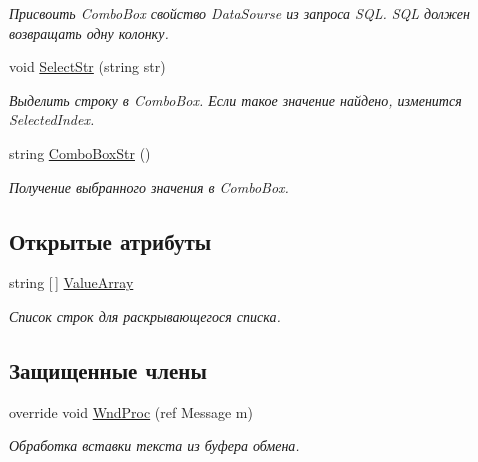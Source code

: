 \begin{DoxyCompactItemize}
\begin{DoxyCompactList}\small\item\em Присвоить Combo\+Box свойство Data\+Sourse из запроса S\+QL. S\+QL должен возвращать одну колонку. \end{DoxyCompactList}\item 
void \mbox{\hyperlink{class_f_b_a_1_1_combo_box_f_b_a_a5c209c5dbfdf27b8239b1aeb58aaf539}{Select\+Str}} (string str)
\begin{DoxyCompactList}\small\item\em Выделить строку в Combo\+Box. Если такое значение найдено, изменится Selected\+Index. \end{DoxyCompactList}\item 
string \mbox{\hyperlink{class_f_b_a_1_1_combo_box_f_b_a_a43f7d2e7d271590ca56c4234cf30da1b}{Combo\+Box\+Str}} ()
\begin{DoxyCompactList}\small\item\em Получение выбранного значения в Combo\+Box. \end{DoxyCompactList}\end{DoxyCompactItemize}
\subsection*{Открытые атрибуты}
\begin{DoxyCompactItemize}
\item 
string \mbox{[}$\,$\mbox{]} \mbox{\hyperlink{class_f_b_a_1_1_combo_box_f_b_a_a021991caa0eefa3c4d70164dd24edd36}{Value\+Array}}
\begin{DoxyCompactList}\small\item\em Список строк для раскрывающегося списка. \end{DoxyCompactList}\end{DoxyCompactItemize}
\subsection*{Защищенные члены}
\begin{DoxyCompactItemize}
\item 
override void \mbox{\hyperlink{class_f_b_a_1_1_combo_box_f_b_a_a2917cbd4f730b2303f0c7ab6f88ce8a7}{Wnd\+Proc}} (ref Message m)
\begin{DoxyCompactList}\small\item\em Обработка вставки текста из буфера обмена. \end{DoxyCompactList}\end{DoxyCompactItemize}
